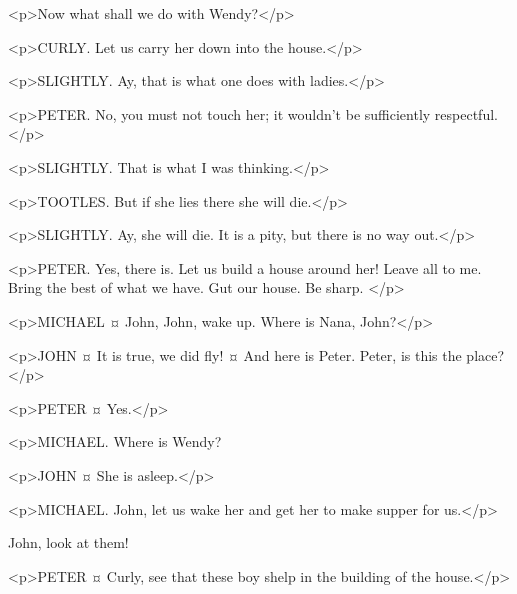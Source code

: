<p>Now what shall we do with Wendy?</p>

<p>CURLY. Let us carry her down into the house.</p>

<p>SLIGHTLY. Ay, that is what one does with ladies.</p>

<p>PETER. No, you must not touch her; it wouldn't be sufficiently respectful.</p>

<p>SLIGHTLY. That is what I was thinking.</p>

<p>TOOTLES. But if she lies there she will die.</p>

<p>SLIGHTLY. Ay, she will die. It is a pity, but there is no way out.</p>

<p>PETER. Yes, there is. Let us build a house around her!
Leave all to me. Bring the best of what we have. Gut our house. Be sharp.
</p>


<p>MICHAEL ¤
John, John, wake up. Where is Nana, John?</p>

<p>JOHN ¤
It is true, we did fly!
¤
And here is Peter. Peter, is this the place?</p>


<p>PETER ¤
Yes.</p>

<p>MICHAEL. Where is Wendy?

<p>JOHN ¤
She is asleep.</p>

<p>MICHAEL. John, let us wake her and get her to make supper for us.</p>


John, look at them! 

<p>PETER ¤
Curly, see that these boy shelp in the building of the house.</p>

